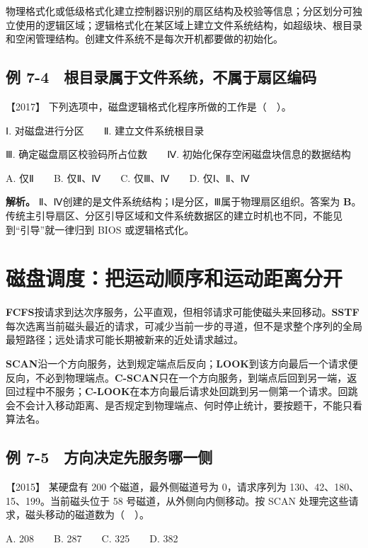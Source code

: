 物理格式化或低级格式化建立控制器识别的扇区结构及校验等信息；分区划分可独立使用的逻辑区域；逻辑格式化在某区域上建立文件系统结构，如超级块、根目录和空闲管理结构。创建文件系统不是每次开机都要做的初始化。

\subsection{例 7-4　根目录属于文件系统，不属于扇区编码}\label{os-ex7-4}

\noindent{}【2017】 下列选项中，磁盘逻辑格式化程序所做的工作是（　）。

Ⅰ. 对磁盘进行分区　　Ⅱ. 建立文件系统根目录

Ⅲ. 确定磁盘扇区校验码所占位数　　Ⅳ. 初始化保存空闲磁盘块信息的数据结构

A. 仅Ⅱ　　B. 仅Ⅱ、Ⅳ　　C. 仅Ⅲ、Ⅳ　　D. 仅Ⅰ、Ⅱ、Ⅳ


\textbf{解析。} Ⅱ、Ⅳ创建的是文件系统结构；Ⅰ是分区，Ⅲ属于物理扇区组织。答案为 \textbf{B}。传统主引导扇区、分区引导区域和文件系统数据区的建立时机也不同，不能见到``引导''就一律归到 BIOS 或逻辑格式化。

\section{磁盘调度：把运动顺序和运动距离分开}\label{os-7-9}

\textbf{FCFS}按请求到达次序服务，公平直观，但相邻请求可能使磁头来回移动。\textbf{SSTF}每次选离当前磁头最近的请求，可减少当前一步的寻道，但不是求整个序列的全局最短路径；远处请求可能长期被新来的近处请求越过。

\textbf{SCAN}沿一个方向服务，达到规定端点后反向；\textbf{LOOK}到该方向最后一个请求便反向，不必到物理端点。\textbf{C-SCAN}只在一个方向服务，到端点后回到另一端，返回过程中不服务；\textbf{C-LOOK}在本方向最后请求处回跳到另一侧第一个请求。回跳会不会计入移动距离、是否规定到物理端点、何时停止统计，要按题干，不能只看算法名。

\subsection{例 7-5　方向决定先服务哪一侧}\label{os-ex7-5}

\noindent{}【2015】 某硬盘有 200 个磁道，最外侧磁道号为 0，请求序列为 130、42、180、15、199。当前磁头位于 58 号磁道，从外侧向内侧移动。按 SCAN 处理完这些请求，磁头移动的磁道数为（　）。

A. 208　　B. 287　　C. 325　　D. 382

